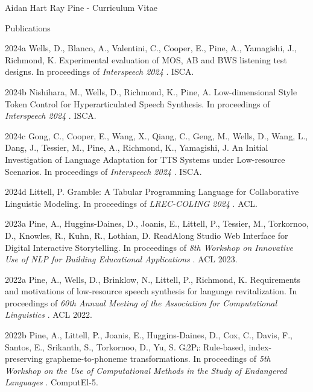 \documentclass[12pt]{letter}
\begin{document}
\begin{cv}{ Aidan Hart Ray Pine  \space - \space   Curriculum Vitae}
        \begin{cvlist}{Publications}
                                                                        \item[2024a] Wells, D., Blanco, A., Valentini, C., Cooper, E., Pine, A., Yamagishi, J., Richmond, K.  Experimental evaluation of MOS, AB and BWS listening test designs. In proceedings of \textit{ Interspeech 2024 }.  ISCA.  
                                                                                \item[2024b] Nishihara, M., Wells, D., Richmond, K., Pine, A.  Low-dimensional Style Token Control for Hyperarticulated Speech Synthesis. In proceedings of \textit{ Interspeech 2024 }.  ISCA.  
                                                                                \item[2024c] Gong, C., Cooper, E., Wang, X., Qiang, C., Geng, M., Wells, D., Wang, L., Dang, J., Tessier, M., Pine, A., Richmond, K., Yamagishi, J.  An Initial Investigation of Language Adaptation for TTS Systems under Low-resource Scenarios. In proceedings of \textit{ Interspeech 2024 }.  ISCA.  
                                                                                \item[2024d] Littell, P.  Gramble: A Tabular Programming Language for Collaborative Linguistic Modeling. In proceedings of \textit{ LREC-COLING 2024 }.  ACL.  
                                                                                                            \item[2023a] Pine, A., Huggins-Daines, D., Joanis, E., Littell, P., Tessier, M., Torkornoo, D., Knowles, R., Kuhn, R., Lothian, D.  ReadAlong Studio Web Interface for Digital Interactive Storytelling. In proceedings of \textit{ 8th Workshop on Innovative Use of NLP for Building Educational Applications }.  ACL 2023.  
                                                                                                            \item[2022a] Pine, A., Wells, D., Brinklow, N., Littell, P., Richmond, K.  Requirements and motivations of low-resource speech synthesis for language revitalization. In proceedings of \textit{ 60th Annual Meeting of the Association for Computational Linguistics }.  ACL 2022.  
                                                                                \item[2022b] Pine, A., Littell, P., Joanis, E., Huggins-Daines, D., Cox, C., Davis, F., Santos, E., Srikanth, S., Torkornoo, D., Yu, S.  Gᵢ2Pᵢ: Rule-based, index-preserving grapheme-to-phoneme transformations. In proceedings of \textit{ 5th Workshop on the Use of Computational Methods in the Study of Endangered Languages }.  ComputEl-5.  

\end{cvlist}
\end{cv}
\end{document}
